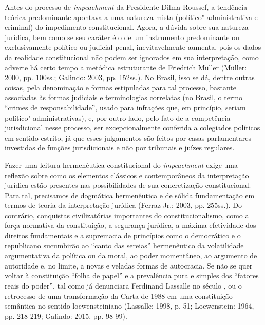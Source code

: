 Antes do processo de \emph{impeachment} da Presidente Dilma Roussef, a
tendência teórica predominante apontava a uma natureza mista
(político"-administrativa e criminal) do impedimento constitucional.
Agora, a dúvida sobre sua natureza jurídica, bem como se seu caráter é o
de um instrumento predominante ou exclusivamente político ou judicial
penal, inevitavelmente aumenta, pois os dados da realidade
constitucional não podem ser ignorados em sua interpretação, como
adverte há certo tempo a metódica estruturante de Friedrich Müller
(Müller: 2000, pp. 100ss.; Galindo: 2003, pp. 152ss.). No Brasil, isso
se dá, dentre outras coisas, pela denominação e formas estipuladas para
tal processo, bastante associadas às formas judiciais e terminologias
correlatas (no Brasil, o termo ``crimes de responsabilidade'', usado
para infrações que, em princípio, seriam político"-administrativas), e,
por outro lado, pelo fato de a competência jurisdicional nesse processo,
ser excepcionalmente conferida a colegiados políticos em sentido
estrito, já que esses julgamentos são feitos por casas parlamentares
investidas de funções jurisdicionais e não por tribunais e juízes
regulares.

Fazer uma leitura hermenêutica constitucional do \emph{impeachment}
exige uma reflexão sobre como os elementos clássicos e contemporâneos da
interpretação jurídica estão presentes nas possibilidades de sua
concretização constitucional. Para tal, precisamos de dogmática
hermenêutica e de sólida fundamentação em termos de teoria da
interpretação jurídica (Ferraz Jr.: 2003, pp. 255ss.). Do contrário,
conquistas civilizatórias importantes do constitucionalismo, como a
força normativa da constituição, a segurança jurídica, a máxima
efetividade dos direitos fundamentais e a supremacia de princípios como
o democrático e o republicano sucumbirão ao ``canto das sereias''
hermenêutico da volatilidade argumentativa da política ou da moral, ao
poder momentâneo, ao argumento de autoridade e, no limite, a novas e
veladas formas de autocracia. Se não se quer voltar à constituição
``folha de papel'' e a prevalência pura e simples dos ``fatores reais do
poder'', tal como já denunciara Ferdinand Lassalle no século , ou o
retrocesso de uma transformação da Carta de 1988 em uma constituição
semântica no sentido loewensteiniano (Lassalle: 1998, p. 51;
Loewenstein: 1964, pp. 218-219; Galindo: 2015, pp. 98-99).

